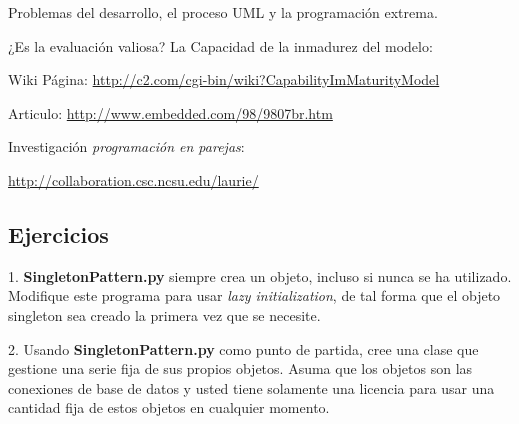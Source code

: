 Problemas del desarrollo, el proceso UML y la programación extrema.\newline 
  
¿Es la evaluación valiosa?  La Capacidad de la inmadurez del modelo: \newline

Wiki Página: \textcolor[rgb]{0.2,0.5,0.7}{\underline{http://c2.com/cgi-bin/wiki?CapabilityImMaturityModel}} \newline 

Articulo: \textcolor[rgb]{0.2,0.5,0.7}{\underline{http://www.embedded.com/98/9807br.htm}} \newline  

Investigación \textit{programación en parejas}:   \newline

\textcolor[rgb]{0.2,0.5,0.7}{\underline{http://collaboration.csc.ncsu.edu/laurie/}} \newline 

\subsection{Ejercicios}

1. \textbf{SingletonPattern.py} siempre crea un objeto,  incluso si nunca se ha utilizado. Modifique este programa para usar \textit{lazy initialization}, de tal forma que el objeto singleton sea creado la primera vez que se necesite.    \newline

2. Usando \textbf{SingletonPattern.py} como punto de partida, cree una clase que gestione una serie fija de sus propios objetos. Asuma que los objetos son las conexiones de base de datos y usted tiene solamente una licencia para usar una cantidad fija de estos objetos en cualquier momento.    \newline